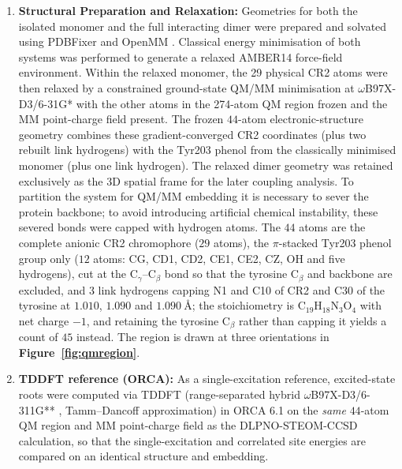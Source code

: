 \documentclass[journal=jpcbfk, manuscript=article, layout=twocolumn, doi=true]{achemso}
\begin{document}
\begin{enumerate}
    \item \textbf{Structural Preparation and Relaxation:} Geometries for both the isolated monomer and the full interacting dimer were prepared and solvated using PDBFixer \cite{openmm2017} and OpenMM \cite{openmm2017}. Classical energy minimisation of both systems was performed to generate a relaxed AMBER14 \cite{amber14_manual} force-field environment. Within the relaxed monomer, the 29 physical CR2 atoms were then relaxed by a constrained ground-state QM/MM minimisation at $\omega$B97X-D3/6-31G* with the other atoms in the 274-atom QM region frozen and the MM point-charge field present. The frozen $44$-atom electronic-structure geometry combines these gradient-converged CR2 coordinates (plus two rebuilt link hydrogens) with the Tyr203 phenol from the classically minimised monomer (plus one link hydrogen). The relaxed dimer geometry was retained exclusively as the 3D spatial frame for the later coupling analysis. To partition the system for QM/MM embedding it is necessary to sever the protein backbone; to avoid introducing artificial chemical instability, these severed bonds were capped with hydrogen atoms. The $44$ atoms are the complete anionic CR2 chromophore ($29$ atoms), the $\pi$-stacked Tyr203 phenol group only ($12$ atoms: CG, CD1, CD2, CE1, CE2, CZ, OH and five hydrogens), cut at the C$_\gamma$--C$_\beta$ bond so that the tyrosine C$_\beta$ and backbone are excluded, and $3$ link hydrogens capping N1 and C10 of CR2 and C30 of the tyrosine at $1.010$, $1.090$ and $1.090~\text{\AA}$; the stoichiometry is C$_{19}$H$_{18}$N$_3$O$_4$ with net charge $-1$, and retaining the tyrosine C$_\beta$ rather than capping it yields a count of $45$ instead. The region is drawn at three orientations in \textbf{Figure~\ref{fig:qmregion}}.

    \item \textbf{TDDFT reference (ORCA):} As a single-excitation reference, excited-state roots were computed via TDDFT (range-separated hybrid $\omega$B97X-D3/6-311G** \cite{mardirossian2017}, Tamm--Dancoff approximation) in ORCA 6.1 \cite{neese2020orca,neese2022orca} on the \emph{same} $44$-atom QM region and MM point-charge field as the DLPNO-STEOM-CCSD calculation, so that the single-excitation and correlated site energies are compared on an identical structure and embedding.


\end{enumerate}
\end{document}

